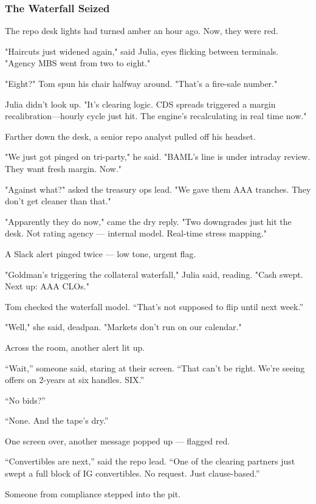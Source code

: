 \medskip

\subsubsection{The Waterfall Seized}

The repo desk lights had turned amber an hour ago.
Now, they were red.

"Haircuts just widened again," said Julia, eyes flicking between terminals. "Agency MBS went from two to eight."

"Eight?" Tom spun his chair halfway around. "That's a fire-sale number."

Julia didn’t look up. "It’s clearing logic. CDS spreads triggered a margin recalibration—hourly cycle just hit. The engine’s recalculating in real time now."

Farther down the desk, a senior repo analyst pulled off his headset.

"We just got pinged on tri-party," he said. "BAML’s line is under intraday review. They want fresh margin. Now."

"Against what?" asked the treasury ops lead. "We gave them AAA tranches. They don’t get cleaner than that."

"Apparently they do now," came the dry reply. "Two downgrades just hit the desk. Not rating agency — internal model. Real-time stress mapping."

A Slack alert pinged twice — low tone, urgent flag.

"Goldman’s triggering the collateral waterfall," Julia said, reading. "Cash swept. Next up: AAA CLOs."

Tom checked the waterfall model. “That’s not supposed to flip until next week.”

"Well," she said, deadpan. "Markets don’t run on our calendar."

Across the room, another alert lit up.

“Wait,” someone said, staring at their screen. “That can’t be right. We’re seeing offers on 2-years at six handles. SIX.”

“No bids?”

“None. And the tape’s dry.”

One screen over, another message popped up — flagged red.

“Convertibles are next,” said the repo lead. “One of the clearing partners just swept a full block of IG convertibles. No request. Just clause-based.”

Someone from compliance stepped into the pit.

